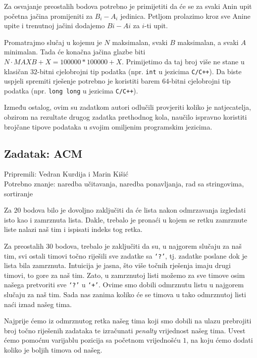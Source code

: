 \documentclass[a4paper]{article}
\begin{document}
Za osvajanje preostalih bodova potrebno je primijetiti da će se za svaki Anin
upit početna jačina promijeniti za $B_i - A_i$ jedinica. Petljom prolazimo kroz
sve Anine upite i trenutnoj jačini dodajemo $Bi - Ai$ za $i$-ti upit.

Promatrajmo slučaj u kojemu je $N$ maksimalan, svaki $B$ maksimalan, a svaki
$A$ minimalan. Tada će konačna jačina glazbe biti $N \cdot MAXB + X = 100000 *
100000 + X$. Primijetimo da taj broj više ne stane u klasičan $32$-bitni
cjelobrojni tip podatka (npr. \texttt{int} u jezicima \texttt{C/C++}). Da
biste uspjeli spremiti rješenje potrebno je koristiti barem $64$-bitni
cjelobrojni tip podatka (npr. \texttt{long long} u jezicima \texttt{C/C++}).

Između ostalog, ovim su zadatkom autori odlučili provjeriti koliko je
natjecatelja, obzirom na rezultate drugog zadatka prethodnog kola, naučilo
ispravno koristiti brojčane tipove podataka u svojim omiljenim programskim
jezicima.

\subsection*{Zadatak: ACM}
\textsf{Pripremili: Vedran Kurdija i Marin Kišić}\\
\textsf{Potrebno znanje: naredba učitavanja, naredba ponavljanja, rad sa
stringovima, sortiranje}

Za $20$ bodova bilo je dovoljno zaključiti da će lista nakon odmrzavanja
izgledati isto kao i zamrznuta lista.  Dakle, trebalo je pronaći u kojem se
retku zamrznute liste nalazi naš tim i ispisati indeks tog retka.

Za preostalih $30$ bodova, trebalo je zaključiti da su, u najgorem slučaju za
naš tim, svi ostali timovi točno riješili sve zadatke sa \texttt{‘?’}, tj.
zadatke poslane dok je lista bila zamrznuta. Intuicija je jasna, što više
točnih rješenja imaju drugi timovi, to gore za naš tim. Zato, u zamrznutoj
listi možemo za sve timove osim našega pretvoriti sve \texttt{‘?’} u
\texttt{‘+’}. Ovime smo dobili odmrznutu listu u najgorem slučaju za naš tim.
Sada nas zanima koliko će se timova u tako odmrznutoj listi naći iznad našeg
tima.

Najprije ćemo iz odmrznutog retka našeg tima koji smo dobili na ulazu
prebrojiti broj točno riješenih zadataka te izračunati \textit{penalty}
vrijednost našeg tima.  Uvest ćemo pomoćnu varijablu pozicija sa početnom
vrijednošću $1$, na koju ćemo dodati koliko je boljih timova od našeg.
\end{document}
